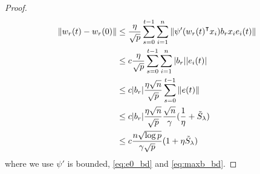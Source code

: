 \begin{proof}
\begin{equation*}
\begin{aligned}
    \|w_r(t)-w_r(0)\| &\leq \frac{\eta}{\sqrt p}\sum_{s=0}^{t-1}\sum_{i=1}^n \|\psi'(w_r(t)\transpose x_i)b_rx_i e_i(t)\| \\
    & \leq c\frac{\eta}{\sqrt p}\sum_{s=0}^{t-1}\sum_{i=1}^n |b_r| |e_i(t)| \\
    & \leq c|b_r|\frac{\eta\sqrt n}{\sqrt p}\sum_{s=0}^{t-1} \|e(t)\| \\
    & \leq c|b_r|\frac{\eta\sqrt n}{\sqrt p}\frac{\sqrt n}{\gamma}(\frac{1}{\eta}+\tilde{S}_\lambda) \\
    & \leq c\frac{n\sqrt{\log p}}{\gamma\sqrt p} (1+\eta \tilde{S}_\lambda)
\end{aligned}
\end{equation*}
where we use $\psi'$ is bounded, \eqref{eq:e0_bd} and \eqref{eq:maxb_bd}.
\end{proof}


